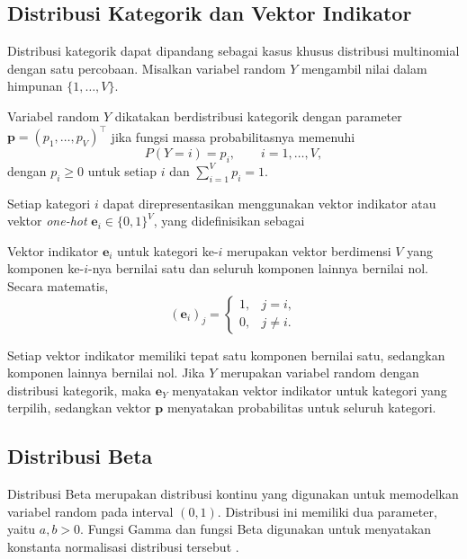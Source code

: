 \subsection{Distribusi Kategorik dan Vektor Indikator}

\label{subsec:distribusikategorik}

Distribusi kategorik dapat dipandang sebagai kasus khusus distribusi
multinomial dengan satu percobaan. Misalkan variabel random $Y$
mengambil nilai dalam himpunan $\{1,\ldots,V\}$.

\begin{definisi}
\label{def:kategorik}
Variabel random $Y$ dikatakan berdistribusi kategorik dengan parameter
$\bm{p}=(p_1,\ldots,p_V)^\top$ jika fungsi massa probabilitasnya
memenuhi
\begin{equation}
P(Y=i)=p_i,\qquad i=1,\ldots,V,
\label{eq:kategorik}
\end{equation}
dengan $p_i\geq 0$ untuk setiap $i$ dan
$\sum_{i=1}^{V}p_i=1$.
\end{definisi}

Setiap kategori $i$ dapat direpresentasikan menggunakan vektor
indikator atau vektor \textit{one-hot} $\bm{e}_i\in\{0,1\}^V$,
yang didefinisikan sebagai
\begin{definisi}
\label{def:onehot}
Vektor indikator $\bm{e}_i$ untuk kategori ke-$i$ merupakan vektor
berdimensi $V$ yang komponen ke-$i$-nya bernilai satu dan seluruh
komponen lainnya bernilai nol. Secara matematis,
\begin{equation}
(\bm{e}_i)_j=
\begin{cases}
1, & j=i,\\
0, & j\neq i.
\end{cases}
\label{eq:vektorindikator}
\end{equation}
\end{definisi}

Setiap vektor indikator memiliki tepat satu komponen
bernilai satu, sedangkan komponen lainnya bernilai nol. Jika $Y$
merupakan variabel random dengan distribusi kategorik, maka $\bm{e}_Y$
menyatakan vektor indikator untuk kategori yang terpilih, sedangkan
vektor $\bm{p}$ menyatakan probabilitas untuk seluruh kategori.


\subsection{Distribusi Beta}
\label{subsec:distribusibeta}

Distribusi Beta merupakan distribusi kontinu yang digunakan untuk
memodelkan variabel random pada interval $(0,1)$. Distribusi ini
memiliki dua parameter, yaitu $a,b>0$. Fungsi Gamma dan
fungsi Beta digunakan untuk menyatakan konstanta normalisasi
distribusi tersebut \citep{casella}.

